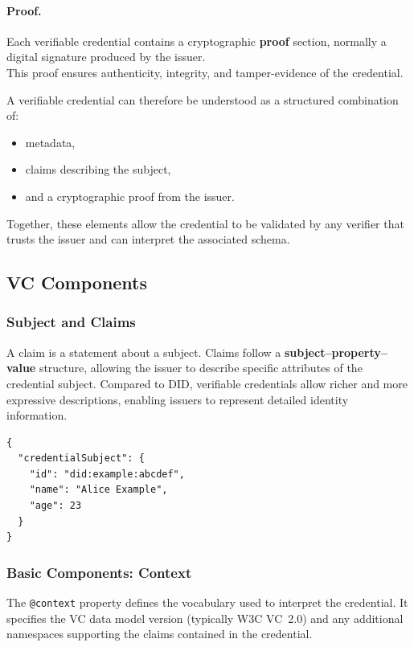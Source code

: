 \paragraph{Proof.}
Each verifiable credential contains a cryptographic \textbf{proof} section, normally a digital signature produced by the issuer. \\ 
This proof ensures authenticity, integrity, and tamper-evidence of the credential.

\medskip

\noindent
A verifiable credential can therefore be understood as a structured combination of:
\begin{itemize}
    \item metadata,
    \item claims describing the subject,
    \item and a cryptographic proof from the issuer.
\end{itemize}
Together, these elements allow the credential to be validated by any verifier that trusts the issuer and can interpret the associated schema.
\subsection{VC Components}

\subsubsection*{Subject and Claims}

A claim is a statement about a subject.  
Claims follow a \textbf{subject–property–value} structure, allowing the issuer
to describe specific attributes of the credential subject.  
Compared to DID, verifiable credentials allow richer and more expressive
descriptions, enabling issuers to represent detailed identity information.

\begin{verbatim}
{
  "credentialSubject": {
    "id": "did:example:abcdef",
    "name": "Alice Example",
    "age": 23
  }
}
\end{verbatim}

\medskip

\subsubsection*{Basic Components: Context}

The \texttt{@context} property defines the vocabulary used to interpret the 
credential.  
It specifies the VC data model version (typically W3C VC~2.0) and any additional
namespaces supporting the claims contained in the credential.


